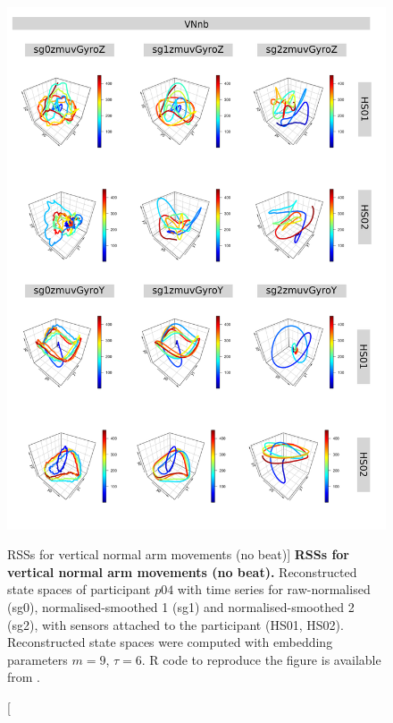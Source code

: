 \begin{figure}
\centering
\includegraphics[height=0.8\textheight]{rss_VNnb_p04}
\caption
	[RSSs for vertical normal arm movements (no beat)]{
	{\bf RSSs for vertical normal arm movements (no beat).}
	Reconstructed state spaces of participant $p04$
	with time series for raw-normalised (sg0), 
	normalised-smoothed 1 (sg1) and 
	normalised-smoothed 2 (sg2), 
	with sensors attached to the participant (HS01, HS02).
	Reconstructed state spaces were computed with 
	embedding parameters $m=9$, $\tau=6$.
	R code to reproduce the figure is available from \cite{hwum2018}.
        }
     \label{fig:rss_VNnb_p04}
\end{figure}



